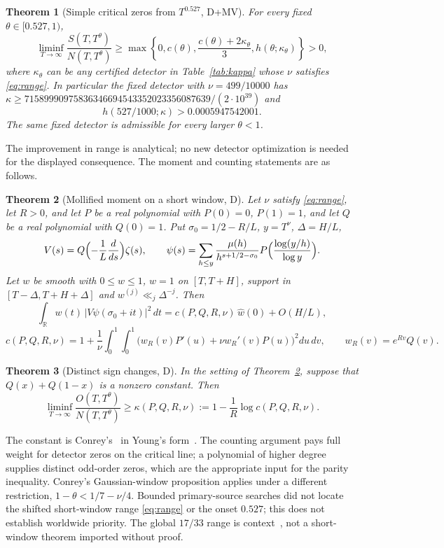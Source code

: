 \documentclass[11pt]{article}
\newtheorem{theorem}{Theorem}[section]
\theoremstyle{remark}
\newcommand{\R}{\mathbb R}
\newcommand{\wh}{\widehat w(0)}
\begin{document}
\begin{theorem}[Simple critical zeros from $T^{0.527}$, D+MV]
\label{thm:main}
For every fixed $\theta\in[0.527,1)$,
\begin{equation}\label{eq:main}
 \liminf_{T\to\infty}\frac{S(T,T^\theta)}{N(T,T^\theta)}
 \ge\max\left\{0,c(\theta),\frac{c(\theta)+2\kappa_\theta}{3},
 h(\theta;\kappa_\theta)\right\}>0,
\end{equation}
where $\kappa_\theta$ can be any certified detector in
Table~\ref{tab:kappa} whose $\nu$ satisfies \eqref{eq:range}.
In particular the fixed detector with $\nu=499/10000$ has
$\kappa\ge71589990975836346694543352023356087639/(2\cdot10^{39})$ and
\[
 h(527/1000;\kappa)>0.0005947542001.
\]
The same fixed detector is admissible for every larger $\theta<1$.
\end{theorem}

The improvement in range is analytical; no new detector optimization
is needed for the displayed consequence. The moment and counting
statements are as follows.

\begin{theorem}[Mollified moment on a short window, D]\label{thm:moment}
Let $\nu$ satisfy \eqref{eq:range}, let $R>0$, and let $P$ be a real polynomial with $P(0)=0$,
$P(1)=1$, and let $Q$ be a real polynomial with $Q(0)=1$. Put
$\sigma_0=1/2-R/L$, $y=T^\nu$, $\Delta=H/L$,
\[
 V(s)=Q\Bigl(-\frac1L\frac{d}{ds}\Bigr)\zeta(s),\qquad
 \psi(s)=\sum_{h\le y}\frac{\mu(h)}{h^{s+1/2-\sigma_0}}
 P\Bigl(\frac{\log(y/h)}{\log y}\Bigr).
\]
Let $w$ be smooth with $0\le w\le1$, $w=1$ on $[T,T+H]$, support in
$[T-\Delta,T+H+\Delta]$ and $w^{(j)}\ll_j\Delta^{-j}$. Then
\[
 \int_\R w(t)\,|V\psi(\sigma_0+it)|^2\,dt=c(P,Q,R,\nu)\,\wh+O(H/L),
\]
\[
 c(P,Q,R,\nu)=1+\frac1\nu\int_0^1\!\!\int_0^1
 \bigl(w_R(v)P'(u)+\nu w_R'(v)P(u)\bigr)^2du\,dv,\qquad w_R(v)=e^{Rv}Q(v).
\]
\end{theorem}

\begin{theorem}[Distinct sign changes, D]\label{thm:signs}
In the setting of Theorem~\ref{thm:moment}, suppose that $Q(x)+Q(1-x)$ is a
nonzero constant. Then
\[
 \liminf_{T\to\infty}\frac{O(T,T^\theta)}{N(T,T^\theta)}\ge
 \kappa(P,Q,R,\nu):=1-\frac1R\log c(P,Q,R,\nu).
\]
\end{theorem}

The constant is Conrey's~\cite{Conrey} in Young's form~\cite{Young}.
The counting argument pays full weight for detector zeros on the critical
line; a polynomial of higher degree supplies distinct odd-order zeros,
which are the appropriate input for the parity inequality. Conrey's
Gaussian-window proposition applies under a different restriction,
$1-\theta<1/7-\nu/4$. Bounded primary-source searches did not locate the
shifted short-window range \eqref{eq:range} or the onset $0.527$; this
does not establish worldwide priority. The global $17/33$ range is
context~\cite{BC}, not a short-window theorem imported without proof.
\end{document}
